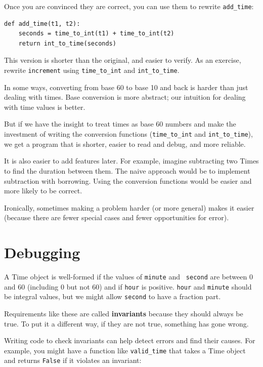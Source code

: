\documentclass[10pt]{book}
\begin{document}
Once you are convinced they are correct, you can use them to
rewrite \verb"add_time":

\begin{verbatim}
def add_time(t1, t2):
    seconds = time_to_int(t1) + time_to_int(t2)
    return int_to_time(seconds)
\end{verbatim}
%
This version is shorter than the original, and easier to verify.  As
an exercise, rewrite {\tt increment} using \verb"time_to_int" and
\verb"int_to_time".

In some ways, converting from base 60 to base 10 and back is harder
than just dealing with times.  Base conversion is more abstract; our
intuition for dealing with time values is better.

But if we have the insight to treat times as base 60 numbers and make
the investment of writing the conversion functions (\verb"time_to_int"
and \verb"int_to_time"), we get a program that is shorter, easier to
read and debug, and more reliable.

It is also easier to add features later.  For example, imagine
subtracting two Times to find the duration between them.  The
naive approach would be to implement subtraction with borrowing.
Using the conversion functions would be easier and more likely to be
correct.

Ironically, sometimes making a problem harder (or more general) makes it
easier (because there are fewer special cases and fewer opportunities
for error).


\section{Debugging}

A Time object is well-formed if the values of {\tt minute} and {\tt
second} are between 0 and 60 (including 0 but not 60) and if
{\tt hour} is positive.  {\tt hour} and {\tt minute} should be
integral values, but we might allow {\tt second} to have a
fraction part.

Requirements like these are called {\bf invariants} because
they should always be true.  To put it a different way, if they
are not true, something has gone wrong.

Writing code to check invariants can help detect errors
and find their causes.  For example, you might have a function
like \verb"valid_time" that takes a Time object and returns
{\tt False} if it violates an invariant:
\end{document}
